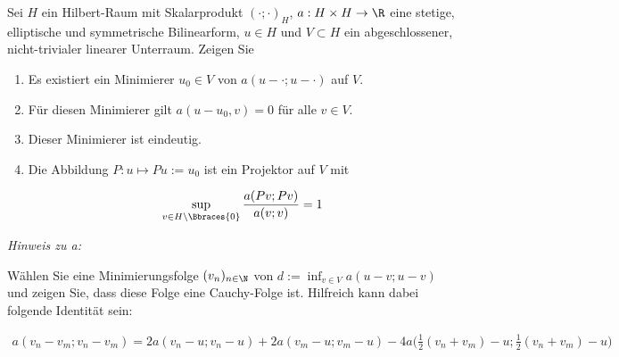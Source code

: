 
\begin{exercise}

Sei $H$ ein Hilbert-Raum mit Skalarprodukt $(\cdot; \cdot)_H$, $a: H \times H \to \R$ eine stetige, elliptische und symmetrische Bilinearform, $u \in H$ und $V \subset H$ ein abgeschlossener, nicht-trivialer linearer Unterraum.
Zeigen Sie

\begin{enumerate}[label = \textbf{\alph*)}]

  \item Es existiert ein Minimierer $u_0 \in V$ von $a(u- \cdot; u- \cdot)$ auf $V$.

  \item Für diesen Minimierer gilt $a(u-u_0,v) = 0$ für alle $v \in V$.

  \item Dieser Minimierer ist eindeutig.

  \item Die Abbildung $P: u \mapsto Pu := u_0$ ist ein Projektor auf $V$ mit

  \begin{align}
    \sup_{v \in H \setminus \Bbraces{0}}
    \frac{a(Pv; Pv)}{a(v; v)} = 1
  \end{align}

\end{enumerate}

\textit{Hinweis zu a:}

Wählen Sie eine Minimierungsfolge $(v_n)_{n \in \N}$ von $d := \inf_{v \in V} a(u-v;u-v)$ und zeigen Sie, dass diese Folge eine Cauchy-Folge ist.
Hilfreich kann dabei folgende Identität sein:

\begin{align}
  a(v_n - v_m ; v_n - v_m )
  =
  2a(v_n - u; v_n - u) + 2a(v_m - u; v_m - u) -
  4a\Bigg(\frac{1}{2}(v_n + v_m ) - u;\frac{1}{2}(v_n + v_m )- u\Bigg)
\end{align}

\end{exercise}


